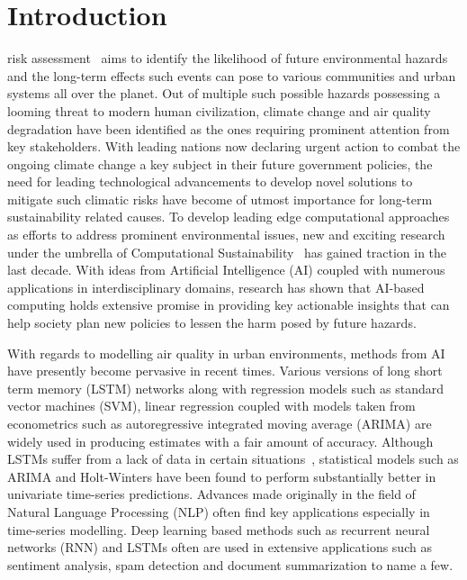 \documentclass[10pt,journal]{IEEEtran}
\begin{document}
\maketitle

\IEEEdisplaynontitleabstractindextext
\IEEEpeerreviewmaketitle


\ifCLASSOPTIONcompsoc
{}
\else
\section{Introduction}
\label{sec:introduction}
\fi

 risk assessment~\cite{Jones.2001} aims to identify the likelihood of future environmental hazards and the long-term effects such events can pose to various communities and urban systems all over the planet. Out of multiple such possible hazards possessing a looming threat to modern human civilization, climate change and air quality degradation have been identified as the ones requiring prominent attention from key stakeholders. With leading nations now declaring urgent action to combat the ongoing climate change a key subject in their future government policies\cite{UN.2015}, the need for leading technological advancements to develop novel solutions to mitigate such climatic risks have become of utmost importance for long-term sustainability related causes. To develop leading edge computational approaches as efforts to address prominent environmental issues, new and exciting research under the umbrella of Computational Sustainability~\cite{Gomes.2019} has gained traction in the last decade. With ideas from Artificial Intelligence (AI) coupled with numerous applications in interdisciplinary domains, research has shown that AI-based computing holds extensive promise in providing key actionable insights that can help society plan new policies to lessen the harm posed by future hazards.

With regards to modelling air quality in urban environments, methods from AI have presently become pervasive in recent times. Various versions of long short term memory (LSTM) networks along with regression models such as standard vector machines (SVM), linear regression coupled with models taken from econometrics such as autoregressive integrated moving average (ARIMA) are widely used in producing estimates with a fair amount of accuracy. Although LSTMs suffer from a lack of data in certain situations~\cite{Nath.2021}, statistical models such as ARIMA and Holt-Winters have been found to perform substantially better in univariate time-series predictions. Advances made originally in the field of Natural Language Processing (NLP) often find key applications especially in time-series modelling. Deep learning based methods such as recurrent neural networks (RNN) and LSTMs often are used in extensive applications such as sentiment analysis, spam detection and document summarization to name a few.
\end{document}
